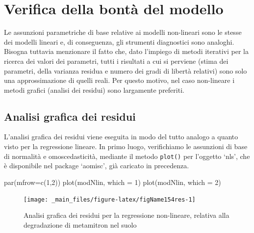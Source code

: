 \documentclass[a4paper,12pt,oneside]{book}
\newenvironment{Shaded}{\begin{snugshade}}{\end{snugshade}}
\newcommand{\DecValTok}[1]{#1}
\newcommand{\FunctionTok}[1]{#1}
\newcommand{\AttributeTok}[1]{#1}
\newcommand{\NormalTok}[1]{#1}
\begin{document}
\hypertarget{verifica-della-bontuxe0-del-modello}{%
\section{Verifica della bontà del modello}\label{verifica-della-bontuxe0-del-modello}}

Le assunzioni parametriche di base relative ai modelli non-lineari sono le stesse dei modelli lineari e, di conseguenza, gli strumenti diagnostici sono analoghi. Bisogna tuttavia menzionare il fatto che, dato l'impiego di metodi iterativi per la ricerca dei valori dei parametri, tutti i risultati a cui si perviene (stima dei parametri, della varianza residua e numero dei gradi di libertà relativi) sono solo una approssimazione di quelli reali. Per questo motivo, nel caso non-lineare i metodi grafici (analisi dei residui) sono largamente preferiti.

\hypertarget{analisi-grafica-dei-residui-1}{%
\subsection{Analisi grafica dei residui}\label{analisi-grafica-dei-residui-1}}

L'analisi grafica dei residui viene eseguita in modo del tutto analogo a quanto visto per la regressione lineare. In primo luogo, verifichiamo le assunzioni di base di normalità e omoscedasticità, mediante il metodo \texttt{plot()} per l'oggetto `nls', che è disponibile nel package `aomisc', già caricato in precedenza.

\begin{Shaded}
\begin{Highlighting}[]
\FunctionTok{par}\NormalTok{(}\AttributeTok{mfrow=}\FunctionTok{c}\NormalTok{(}\DecValTok{1}\NormalTok{,}\DecValTok{2}\NormalTok{))}
\FunctionTok{plot}\NormalTok{(modNlin, }\AttributeTok{which =} \DecValTok{1}\NormalTok{)}
\FunctionTok{plot}\NormalTok{(modNlin, }\AttributeTok{which =} \DecValTok{2}\NormalTok{)}
\end{Highlighting}
\end{Shaded}

\begin{figure}

{\centering \texttt{[image: \_main\_files/figure-latex/figName154res-1]} 

}

\caption{Analisi grafica dei residui per la regressione non-lineare, relativa alla degradazione di metamitron nel suolo}\label{fig:figName154res}
\end{figure}
\end{document}
